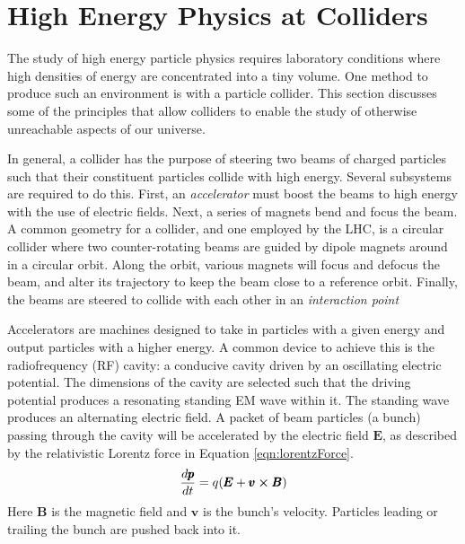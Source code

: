 \section{High Energy Physics at Colliders}

The study of high energy particle physics requires laboratory conditions where high densities of energy are concentrated into a tiny volume.
One method to produce such an environment is with a particle collider.
This section discusses some of the principles that allow colliders to enable the study of otherwise unreachable aspects of our universe.

In general, a collider has the purpose of steering two beams of charged particles such that their constituent particles collide with high energy.
Several subsystems are required to do this.
First, an \emph{accelerator} must boost the beams to high energy with the use of electric fields.
Next, a series of magnets bend and focus the beam. 
A common geometry for a collider, and one employed by the LHC, is a circular collider where two counter-rotating beams are guided by dipole magnets around in a circular orbit.
Along the orbit, various magnets will focus and defocus the beam, and alter its trajectory to keep the beam close to a reference orbit.
Finally, the beams are steered to collide with each other in an \emph{interaction point}

Accelerators are machines designed to take in particles with a given energy and output particles with a higher energy.
A common device to achieve this is the radiofrequency (RF) cavity: a conducive cavity driven by an oscillating electric potential.
The dimensions of the cavity are selected such that the driving potential produces a resonating standing EM wave within it.
The standing wave produces an alternating electric field.
A packet of beam particles (a bunch) passing through the cavity will be accelerated by the electric field $\pmb E$, as described by the relativistic Lorentz force in Equation \ref{eqn:lorentzForce}.
\begin{equation}\begin{split}\label{eqn:lorentzForce}
\frac{d\pmb{p}}{dt}=q(\pmb E+\pmb v\cross\pmb B)
\end{split}\end{equation} 
Here $\pmb B$ is the magnetic field and $\pmb v$ is the bunch's velocity.
Particles leading or trailing the bunch are pushed back into it.

